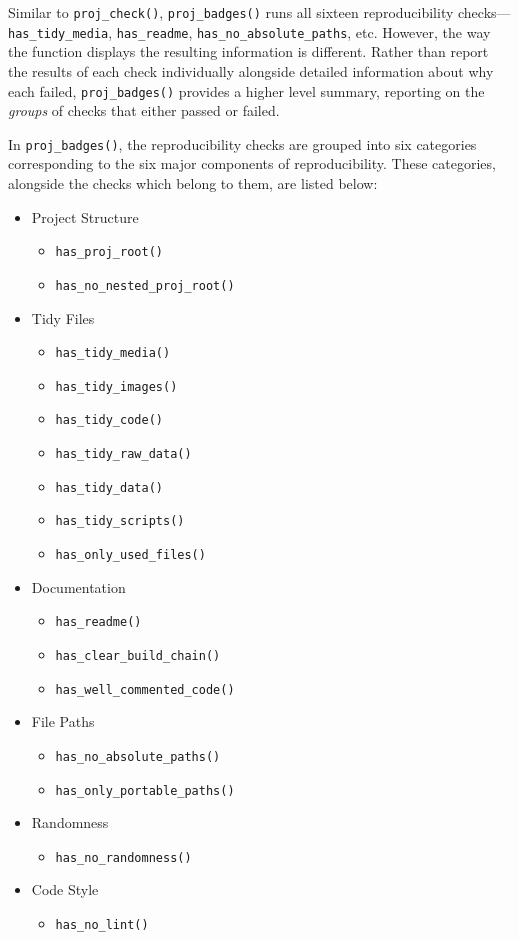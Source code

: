 \documentclass[12pt,twoside]{reedthesis}
\providecommand{\tightlist}{%
  \setlength{\itemsep}{0pt}\setlength{\parskip}{0pt}}
\begin{document}
Similar to \texttt{proj\_check()}, \texttt{proj\_badges()} runs all sixteen reproducibility checks---\texttt{has\_tidy\_media}, \texttt{has\_readme}, \texttt{has\_no\_absolute\_paths}, etc. However, the way the function displays the resulting information is different. Rather than report the results of each check individually alongside detailed information about why each failed, \texttt{proj\_badges()} provides a higher level summary, reporting on the \emph{groups} of checks that either passed or failed.

In \texttt{proj\_badges()}, the reproducibility checks are grouped into six categories corresponding to the six major components of reproducibility. These categories, alongside the checks which belong to them, are listed below:
\begin{itemize}
\tightlist
\item
  Project Structure
  \begin{itemize}
  \tightlist
  \item
    \texttt{has\_proj\_root()}
  \item
    \texttt{has\_no\_nested\_proj\_root()}
  \end{itemize}
\item
  Tidy Files
  \begin{itemize}
  \tightlist
  \item
    \texttt{has\_tidy\_media()}
  \item
    \texttt{has\_tidy\_images()}
  \item
    \texttt{has\_tidy\_code()}
  \item
    \texttt{has\_tidy\_raw\_data()}
  \item
    \texttt{has\_tidy\_data()}
  \item
    \texttt{has\_tidy\_scripts()}
  \item
    \texttt{has\_only\_used\_files()}
  \end{itemize}
\item
  Documentation
  \begin{itemize}
  \tightlist
  \item
    \texttt{has\_readme()}
  \item
    \texttt{has\_clear\_build\_chain()}
  \item
    \texttt{has\_well\_commented\_code()}
  \end{itemize}
\item
  File Paths
  \begin{itemize}
  \tightlist
  \item
    \texttt{has\_no\_absolute\_paths()}
  \item
    \texttt{has\_only\_portable\_paths()}
  \end{itemize}
\item
  Randomness
  \begin{itemize}
  \tightlist
  \item
    \texttt{has\_no\_randomness()}
  \end{itemize}
\item
  Code Style
  \begin{itemize}
  \tightlist
  \item
    \texttt{has\_no\_lint()}
  \end{itemize}
\end{itemize}
\end{document}
